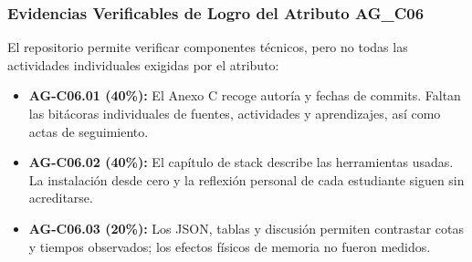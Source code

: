 \subsubsection{Evidencias Verificables de Logro del Atributo AG\_C06}
El repositorio permite verificar componentes técnicos, pero no todas las actividades individuales exigidas por el atributo:
\begin{itemize}
    \item \textbf{AG-C06.01 (40\%):} El Anexo C recoge autoría y fechas de commits. Faltan las bitácoras individuales de fuentes, actividades y aprendizajes, así como actas de seguimiento.
    \item \textbf{AG-C06.02 (40\%):} El capítulo de stack describe las herramientas usadas. La instalación desde cero y la reflexión personal de cada estudiante siguen sin acreditarse.
    \item \textbf{AG-C06.03 (20\%):} Los JSON, tablas y discusión permiten contrastar cotas y tiempos observados; los efectos físicos de memoria no fueron medidos.
\end{itemize}
